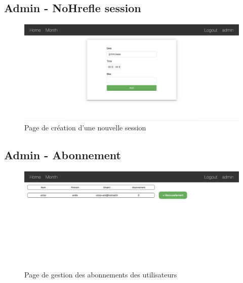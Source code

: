 	\vspace{\baselineskip}
	\subsection{Admin - NoHrefle session}
		\begin{figure}[h!]
       	 	\includegraphics[width=0.8\linewidth, center]{Mockup/Admin-Nouvelle-Session.png}
       	 	\caption{Page de création d'une nouvelle session}
       	\end{figure}
       	
	\newpage
	\subsection{Admin - Abonnement}
		\begin{figure}[h!]
       	 	\includegraphics[width=0.8\linewidth, center]{Mockup/Admin-Abonnement.png}
       	 	\caption{Page de gestion des abonnements des utilisateurs}
       	\end{figure}
       	
